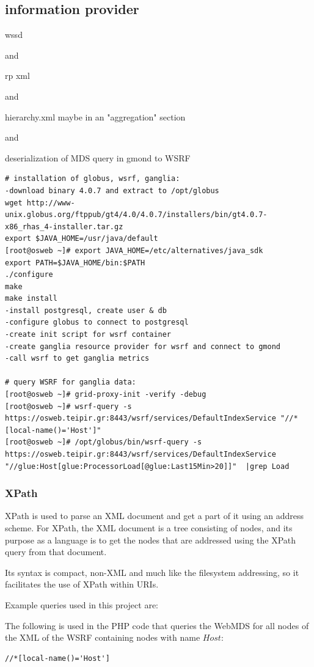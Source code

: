 \subsection{information provider}
wssd

and

rp xml

and

hierarchy.xml maybe in an "aggregation" section

and

deserialization of MDS query in gmond to WSRF
 
\begin{verbatim}
# installation of globus, wsrf, ganglia:
-download binary 4.0.7 and extract to /opt/globus
wget http://www-unix.globus.org/ftppub/gt4/4.0/4.0.7/installers/bin/gt4.0.7-x86_rhas_4-installer.tar.gz
export $JAVA_HOME=/usr/java/default
[root@osweb ~]# export JAVA_HOME=/etc/alternatives/java_sdk
export PATH=$JAVA_HOME/bin:$PATH
./configure
make
make install
-install postgresql, create user & db
-configure globus to connect to postgresql
-create init script for wsrf container
-create ganglia resource provider for wsrf and connect to gmond
-call wsrf to get ganglia metrics

# query WSRF for ganglia data:
[root@osweb ~]# grid-proxy-init -verify -debug
[root@osweb ~]# wsrf-query -s https://osweb.teipir.gr:8443/wsrf/services/DefaultIndexService "//*[local-name()='Host']"
[root@osweb ~]# /opt/globus/bin/wsrf-query -s https://osweb.teipir.gr:8443/wsrf/services/DefaultIndexService "//glue:Host[glue:ProcessorLoad[@glue:Last15Min>20]]"  |grep Load
\end{verbatim}

\newpage
\subsubsection{XPath}

XPath is used to parse an XML document and get a part of it using an address scheme. For XPath, the XML document is a tree consisting of nodes, and its purpose as a language is to get the nodes that are addressed using the XPath query from that document.

Its syntax is compact, non-XML and much like the filesystem addressing, so it facilitates the use of XPath within URIs.

Example queries used in this project are:

The following is used in the PHP code that queries the WebMDS for all nodes of the XML of the WSRF containing nodes with name $Host$:
\begin{verbatim}
//*[local-name()='Host']
\end{verbatim}


